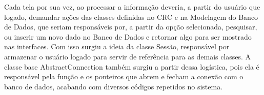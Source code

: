 Cada tela por sua vez, ao processar a informação deveria, a partir do usuário que logado, demandar ações das classes definidas no C\+RC e na Modelagem do Banco de Dados, que seriam responsáveis por, a partir da opção selecionada, pesquisar, ou inserir um novo dado no Banco de Dados e retornar algo para ser mostrado nas interfaces. Com isso surgiu a ideia da classe Sessão, responsável por armazenar o usuário logado para servir de referência para as demais classes. A classe base Abstract\+Connection também surgiu a partir dessa logística, pois ela é responsável pela função e os ponteiros que abrem e fecham a conexão com o banco de dados, acabando com diversos códigos repetidos no sistema. 